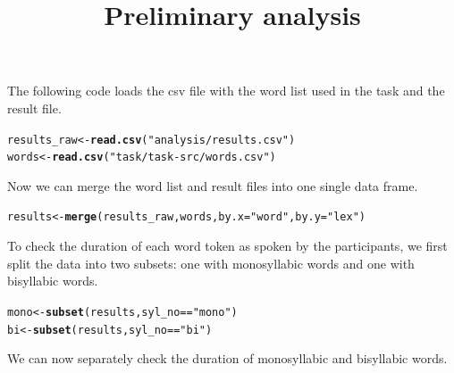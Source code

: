 \documentclass[a4paper,11pt]{article}\usepackage[]{graphicx}\usepackage[]{color}
\title{Preliminary analysis}
\makeatletter
\newcommand{\hlstr}[1]{\textcolor[rgb]{0.192,0.494,0.8}{#1}}%
\newcommand{\hlopt}[1]{\textcolor[rgb]{0,0,0}{#1}}%
\newcommand{\hlstd}[1]{\textcolor[rgb]{0.345,0.345,0.345}{#1}}%
\newcommand{\hlkwb}[1]{\textcolor[rgb]{0.69,0.353,0.396}{#1}}%
\newcommand{\hlkwc}[1]{\textcolor[rgb]{0.333,0.667,0.333}{#1}}%
\newcommand{\hlkwd}[1]{\textcolor[rgb]{0.737,0.353,0.396}{\textbf{#1}}}%
\newenvironment{kframe}{%
 \def\at@end@of@kframe{}%
 \ifinner\ifhmode%
  \def\at@end@of@kframe{\end{minipage}}%
  \begin{minipage}{\columnwidth}%
 \fi\fi%
 \def\FrameCommand##1{\hskip\@totalleftmargin \hskip-\fboxsep
 \colorbox{shadecolor}{##1}\hskip-\fboxsep
     \hskip-\linewidth \hskip-\@totalleftmargin \hskip\columnwidth}%
 \MakeFramed {\advance\hsize-\width
   \@totalleftmargin\z@ \linewidth\hsize
   \@setminipage}}%
 {\par\unskip\endMakeFramed%
 \at@end@of@kframe}
\newenvironment{knitrout}{}{} %
\makeatother
\begin{document}
\maketitle


The following code loads the csv file with the word list used in the task and the result file.

\begin{knitrout}
\color{fgcolor}\begin{kframe}
\begin{alltt}
\hlstd{results_raw} \hlkwb{<-} \hlkwd{read.csv}\hlstd{(}\hlstr{"analysis/results.csv"}\hlstd{)}
\hlstd{words} \hlkwb{<-} \hlkwd{read.csv}\hlstd{(}\hlstr{"task/task-src/words.csv"}\hlstd{)}
\end{alltt}
\end{kframe}
\end{knitrout}

Now we can merge the word list and result files into one single data frame.

\begin{knitrout}
\color{fgcolor}\begin{kframe}
\begin{alltt}
\hlstd{results} \hlkwb{<-} \hlkwd{merge}\hlstd{(results_raw, words,} \hlkwc{by.x} \hlstd{=} \hlstr{"word"}\hlstd{,} \hlkwc{by.y} \hlstd{=} \hlstr{"lex"}\hlstd{)}
\end{alltt}
\end{kframe}
\end{knitrout}

To check the duration of each word token as spoken by the participants, we first split the data into two subsets: one with monosyllabic words and one with bisyllabic words.

\begin{knitrout}
\color{fgcolor}\begin{kframe}
\begin{alltt}
\hlstd{mono} \hlkwb{<-} \hlkwd{subset}\hlstd{(results, syl_no} \hlopt{==} \hlstr{"mono"}\hlstd{)}
\hlstd{bi} \hlkwb{<-} \hlkwd{subset}\hlstd{(results, syl_no} \hlopt{==} \hlstr{"bi"}\hlstd{)}
\end{alltt}
\end{kframe}
\end{knitrout}

We can now separately check the duration of monosyllabic and bisyllabic words.
\end{document}
